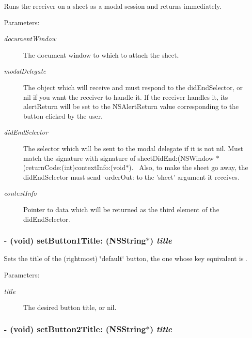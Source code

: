 Runs the receiver on a sheet as a modal session and returns immediately. 

\begin{Desc}
\item[Parameters:]
\begin{description}
\item[{\em documentWindow}]The document window to which to attach the sheet. \item[{\em modalDelegate}]The object which will receive and must respond to the didEndSelector, or nil if you want the receiver to handle it. If the receiver handles it, its alertReturn will be set to the NSAlertReturn value corresponding to the button clicked by the user. \item[{\em didEndSelector}]The selector which will be sent to the modal delegate if it is not nil. Must match the signature with signature of sheetDidEnd:(NSWindow $\ast$)returnCode:(int)contextInfo:(void$\ast$).~ Also, to make the sheet go away, the didEndSelector must send -orderOut: to the 'sheet' argument it receives. \item[{\em contextInfo}]Pointer to data which will be returned as the third element of the didEndSelector. \end{description}
\end{Desc}
\hypertarget{interface_s_s_y_alert_345913b14e1928b90356fdea34870286}{
\subsubsection[{setButton1Title:}]{\setlength{\rightskip}{0pt plus 5cm}- (void) setButton1Title: (NSString$\ast$) {\em title}}}
\label{interface_s_s_y_alert_345913b14e1928b90356fdea34870286}


Sets the title of the (rightmost) \char`\"{}default\char`\"{} button, the one whose key equivalent is . 

\begin{Desc}
\item[Parameters:]
\begin{description}
\item[{\em title}]The desired button title, or nil. \end{description}
\end{Desc}
\hypertarget{interface_s_s_y_alert_d21c7e11150433813919127326a49692}{
\subsubsection[{setButton2Title:}]{\setlength{\rightskip}{0pt plus 5cm}- (void) setButton2Title: (NSString$\ast$) {\em title}}}
\label{interface_s_s_y_alert_d21c7e11150433813919127326a49692}


